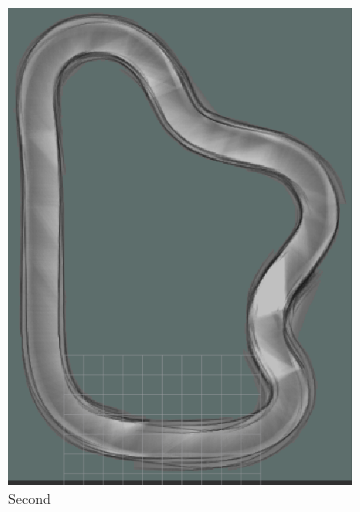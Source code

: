 \begin{figure}
\begin{subfigure}{.3\linewidth}
		\includegraphics[width=\textwidth]{Pictures/1slamtest2}
		\caption{Second}
	\end{subfigure}
	\begin{subfigure}{.3\linewidth}

\end{subfigure}
\end{figure}
